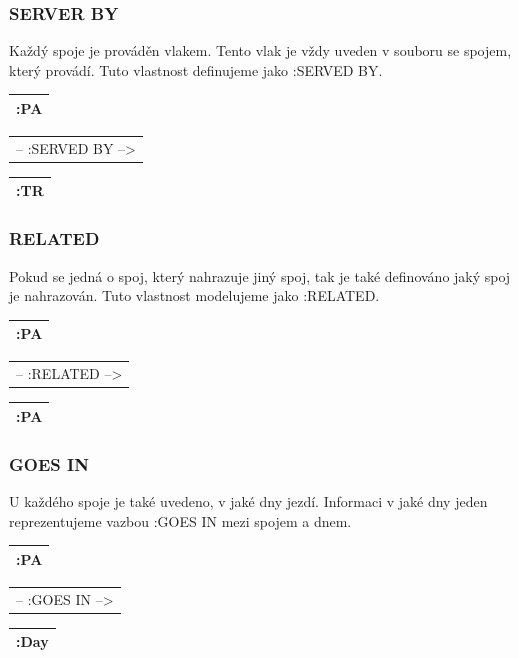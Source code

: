 \documentclass[10pt,xcolor=pdflatex,dvipsnames,table,oneside]{book}
\begin{document}
\subsubsection{SERVER BY}
Každý spoje je prováděn vlakem. Tento vlak je vždy uveden v souboru se spojem, který provádí. Tuto vlastnost
definujeme jako :SERVED BY.

\vspace{1em}
\begin{tabular}{|l|}
    \hline
    :PA \\
    \hline
\end{tabular}
\begin{tabular}{c}
    -- :SERVED BY --> \\
\end{tabular}
\begin{tabular}{|l|}
    \hline
    :TR \\
    \hline
\end{tabular}

\subsubsection{RELATED}
Pokud se jedná o spoj, který nahrazuje jiný spoj, tak je také definováno jaký spoj je nahrazován. Tuto vlastnost
modelujeme jako :RELATED.

\vspace{1em}
\begin{tabular}{|l|}
    \hline
    :PA \\
    \hline
\end{tabular}
\begin{tabular}{c}
    -- :RELATED --> \\
\end{tabular}
\begin{tabular}{|l|}
    \hline
    :PA \\
    \hline
\end{tabular}

\subsubsection{GOES IN}
U každého spoje je také uvedeno, v jaké dny jezdí. Informaci v jaké dny jeden reprezentujeme vazbou :GOES IN mezi spojem a dnem.

\vspace{1em}
\begin{tabular}{|l|}
    \hline
    :PA \\
    \hline
\end{tabular}
\begin{tabular}{c}
    -- :GOES IN --> \\
\end{tabular}
\begin{tabular}{|l|}
    \hline
    :Day \\
    \hline
\end{tabular}
\end{document}
